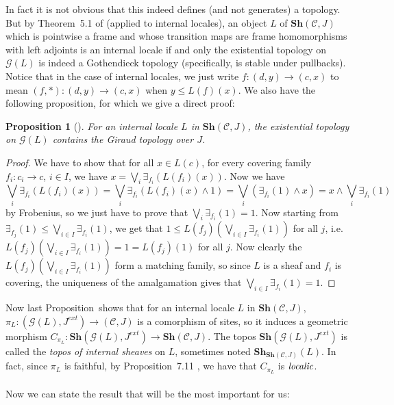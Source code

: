\documentclass{article}
\newtheorem{proposition}[theorem]{Proposition}
\begin{document}
In fact it is not obvious that this indeed defines (and not generates) a topology. But by Theorem~5.1 of \cite{caramello2022fibred} (applied to internal locales), an object $L$ of $\mathbf{Sh}(\mathcal{C},J)$ which is pointwise a frame and whose transition maps are frame homomorphisms with left adjoints is an internal locale if and only the existential topology on $\mathcal{G}(L)$ is indeed a Gothendieck topology (specifically, is stable under pullbacks). Notice that in the case of internal locales, we just write $f:(d,y)\xrightarrow{}(c,x)$ to mean $(f,*):(d,y)\xrightarrow{}(c,x)$ when $y\leq L(f)(x)$. We also have the following proposition, for which we give a direct proof:

\begin{proposition}[\cite{caramello2022fibred}]
    For an internal locale $L$ in $\mathbf{Sh}(\mathcal{C},J)$, the existential topology on $\mathcal{G}(L)$ contains the Giraud topology over $J$.
\end{proposition}
\begin{proof}
    We have to show that for all $x\in L(c)$, for every covering family $f_i:c_i\xrightarrow{}c$, $i\in I$, we have $x=\bigvee_i \exists_{f_i}(L(f_i)(x))$. Now we have 
    $$\bigvee_i \exists_{f_i}(L(f_i)(x))=\bigvee_i \exists_{f_i}(L(f_i)(x)\land 1)=\bigvee_i (\exists_{f_i}(1)\land x)=x\land \bigvee_i \exists_{f_i}(1)$$
    by Frobenius, so we just have to prove that $\bigvee_i \exists_{f_i}(1)=1$. Now starting from $\exists_{f_j}(1)\leq \bigvee_{i\in I}\exists_{f_i}(1)$, we get that $1\leq L(f_j)(\bigvee_{i\in I}\exists_{f_i}(1))$ for all $j$, i.e. $L(f_j)(\bigvee_{i\in I}\exists_{f_i}(1))=1=L(f_j)(1)$ for all $j$. Now clearly the $L(f_j)(\bigvee_{i\in I}\exists_{f_i}(1))$ form a matching family, so since $L$ is a sheaf and $f_i$ is covering, the uniqueness of the amalgamation gives that $\bigvee_{i\in I}\exists_{f_i}(1)=1$.
\end{proof}

Now last Proposition~shows that for an internal locale $L$ in $\mathbf{Sh}(\mathcal{C},J)$, $\pi_L:(\mathcal{G}(L),J^{ext})\xrightarrow{}(\mathcal{C},J)$ is a comorphism of sites, so it induces a geometric morphism $C_{\pi_L}:\mathbf{Sh}(\mathcal{G}(L),J^{ext})\xrightarrow{}\mathbf{Sh}(\mathcal{C},J)$. The topos $\mathbf{Sh}(\mathcal{G}(L),J^{ext})$ is called the \emph{topos of internal sheaves} on $L$, sometimes noted $\mathbf{Sh}_{\mathbf{Sh}(\mathcal{C},J)}(L)$. In fact, since $\pi_L$ is faithful, by Proposition~7.11 \cite{caramello2019denseness}, we have that $C_{\pi_L}$ is $\emph{localic}$.\\
\\
Now we can state the result that will be the most important for us:
\end{document}
